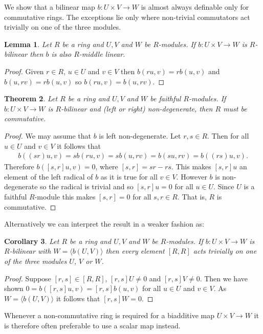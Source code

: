 \documentclass[12pt]{article}
\newtheorem{thm}{Theorem}
\newtheorem{coro}[thm]{Corollary}
\newtheorem{lemma}[thm]{Lemma}
\begin{document}
We show that a bilinear map $b:U\times V\to W$ is almost always definable only for commutative rings.
The exceptions lie only where non-trivial commutators act trivially on one of the
three modules.

\begin{lemma}
Let $R$ be a ring and $U,V$ and $W$ be $R$-modules.
If $b:U\times V\to W$ is $R$-bilinear then $b$ is also $R$-middle linear.
\end{lemma}
\begin{proof}
Given $r\in R$, $u\in U$ and $v\in V$ then 
$b(ru,v)=rb(u,v)$ and $b(u,rv)=rb(u,v)$ so $b(ru,v)=b(u,rv)$.
\end{proof}

\begin{thm}
Let $R$ be a ring and $U,V$ and $W$ be faithful $R$-modules.
If $b:U\times V\to W$ is $R$-bilinear and (left or right) non-degenerate, 
then $R$ must be commutative.
\end{thm}
\begin{proof}
We may assume that $b$ is left non-degenerate.
Let $r,s\in R$.  Then for all $u\in U$ and $v\in V$ it follows that
\begin{multline*}
b((sr)u,v)=sb(ru,v)=sb(u,rv)=b(su,rv)=b((rs)u,v).
\end{multline*}
Therefore $b([s,r]u,v)=0$, where $[s,r]=sr-rs$.  This makes 
$[s,r]u$ an element of the left radical of $b$ as it is true for all $v\in V$.
However $b$ is non-degenerate so the radical is trivial and so $[s,r]u=0$ for
all $u\in U$.  Since $U$ is a faithful $R$-module this makes $[s,r]=0$ for all 
$s,r\in R$.  That is, $R$ is commutative.
\end{proof}

Alternatively we can interpret the result in a weaker fashion as:
\begin{coro}
Let $R$ be a ring and $U,V$ and $W$ be $R$-modules.
If $b:U\times V\to W$ is $R$-bilinear with $W=\langle b(U,V)\rangle$ then 
every element $[R,R]$ acts trivially
on one of the three modules $U$, $V$ or $W$.
\end{coro}
\begin{proof}
Suppose $[r,s]\in [R,R]$, $[r,s]U\neq 0$ and $[r,s]V\neq 0$.  Then we have shown
$0=b([r,s]u,v)=[r,s]b(u,v)$ for all $u\in U$ and $v\in V$.  
As $W=\langle b(U,V)\rangle$ it follows that $[r,s]W=0$.
\end{proof}

Whenever a non-commutative ring is required for a biadditive map $U\times V\to W$ 
it is therefore often preferable to use a scalar map instead.
\end{document}
